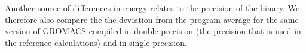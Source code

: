 Another source of differences in energy relates to the precision of
the binary.  We therefore also compare the the deviation from the
program average for the same version of GROMACS compiled in double
precision (the precision that is used in the reference calculations)
and in single precision.


